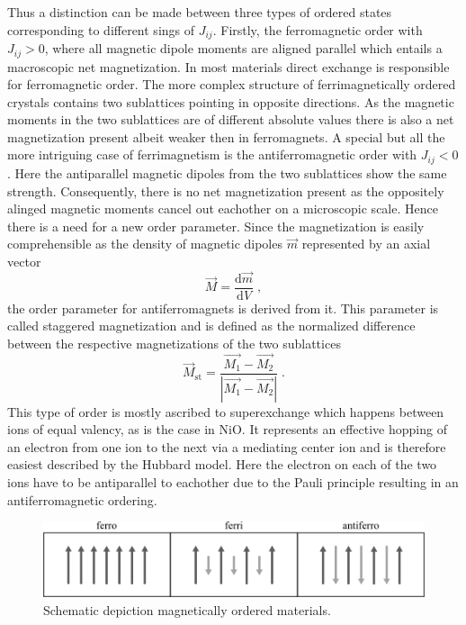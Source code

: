 Thus a distinction can be made between three types of ordered states corresponding to different sings of $J_{ij}$.
Firstly, the ferromagnetic order with $J_{ij}>0$, where all magnetic dipole moments are aligned parallel which entails a macroscopic net magnetization.
In most materials direct exchange is responsible for ferromagnetic order.
The more complex structure of ferrimagnetically ordered crystals contains two sublattices pointing in opposite directions.
As the magnetic moments in the two sublattices are of different absolute values there is also a net magnetization present albeit weaker then in ferromagnets.
A special but all the more intriguing case of ferrimagnetism is the antiferromagnetic order with $J_{ij}<0$.
Here the antiparallel magnetic dipoles from the two sublattices show the same strength.
Consequently, there is no net magnetization present as the oppositely alinged magnetic moments cancel out eachother on a microscopic scale.
Hence there is a need for a new order parameter.
Since the magnetization is easily comprehensible as the density of magnetic dipoles $\vec{m}$ represented by an axial vector
\begin{equation}
    \vec{M} = \frac{\text{d}\vec{m}}{\text{d} V} \;,
\end{equation}
the order parameter for antiferromagnets is derived from it.
This parameter is called staggered magnetization and is defined as the normalized difference between the respective magnetizations of the two sublattices
\begin{equation}
    \vec{M}_{\text{st}} = \frac{\vec{M_1} - \vec{M_2}}{|\vec{M_1} - \vec{M_2}|} \;.
\end{equation}
This type of order is mostly ascribed to superexchange which happens between ions of equal valency, as is the case in NiO.
It represents an effective hopping of an electron from one ion to the next via a mediating center ion and is therefore easiest described by the Hubbard model.
Here the electron on each of the two ions have to be antiparallel to eachother due to the Pauli principle resulting in an antiferromagnetic ordering.
\begin{figure}[ht]
    \centering
    \includegraphics[width=\textwidth]{pictures/magnetic_order.png}
    \caption{Schematic depiction magnetically ordered materials.}
    \label{fig:magnetic_order}
\end{figure}
\FloatBarrier 


